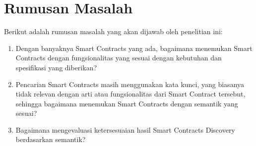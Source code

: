 \section{Rumusan Masalah}
\label{sec:rumusan-masalah}

Berikut adalah rumusan masalah yang akan dijawab oleh penelitian ini:
\begin{enumerate}
  \item Dengan banyaknya Smart Contracts yang ada, bagaimana menemukan Smart Contracts dengan fungsionalitas yang sesuai dengan kebutuhan dan spesifikasi yang diberikan?
  \item Pencarian Smart Contracts masih menggunakan kata kunci, yang biasanya tidak relevan dengan arti atau fungsionalitas dari Smart Contract tersebut, sehingga bagaimana menemukan Smart Contracts dengan semantik yang sesuai?
  \item Bagaimana mengevaluasi ketersesuaian hasil Smart Contracts Discovery berdasarkan semantik?
\end{enumerate}



